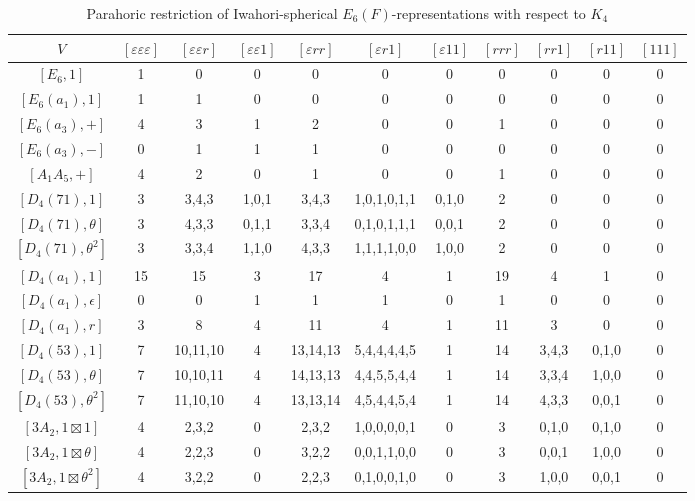 \begin{table}[ht]
    \centering
    \caption{Parahoric restriction of Iwahori-spherical $E_6(F)$-representations with respect to $K_4$}
    \label{tab:e6_a2a2a2_restriction_Dan}
    \begin{adjustbox}{max width=\linewidth}
    \begin{tabular}{|c|cccccccccc|}
    \hline
    $V$ & $[\varepsilon\varepsilon\varepsilon]$ & $[\varepsilon\varepsilon r]$ & $[\varepsilon\varepsilon 1]$ & $[\varepsilon r r]$ & $[\varepsilon r 1]$ & $[\varepsilon 1 1]$ & $[r r r]$ & $[r r 1]$ & $[r 1 1]$ & $[1 1 1]$ \\ \hline
    $[E_6, 1]$             & 1 & 0 & 0 & 0 & 0 & 0 & 0 & 0 & 0 & 0 \\ \hline
    $[E_6(a_1), 1]$        & 1 & 1 & 0 & 0 & 0 & 0 & 0 & 0 & 0 & 0\\ \hline
    $[E_6(a_3), +]$        & 4 & 3 & 1 & 2 & 0 & 0 & 1 & 0 & 0 & 0\\ 
    $[E_6(a_3), -]$        & 0 & 1 & 1 & 1 & 0 & 0 & 0 & 0 & 0 & 0\\ 
    $[A_1A_5, +]$          & 4 & 2 & 0 & 1 & 0 & 0 & 1 & 0 & 0 & 0\\ \hline

    $[D_4(71), 1]$         & 3 & 3,4,3 & 1,0,1 & 3,4,3 & 1,0,1,0,1,1 & 0,1,0 & 2 & 0 & 0 & 0 \\ 
    $[D_4(71), \theta]$    & 3 & 4,3,3 & 0,1,1 & 3,3,4 & 0,1,0,1,1,1 & 0,0,1 & 2 & 0 & 0 & 0 \\
    $[D_4(71), \theta^2]$  & 3 & 3,3,4 & 1,1,0 & 4,3,3 & 1,1,1,1,0,0 & 1,0,0 & 2 & 0 & 0 & 0 \\ \hline

    $[D_4(a_1), 1]$        & 15 & 15 & 3 & 17 & 4 & 1 & 19 & 4 & 1 & 0 \\ 
    $[D_4(a_1), \epsilon]$  & 0 & 0 & 1 & 1 & 1 & 0 & 1 & 0 & 0 & 0\\ 
    $[D_4(a_1), r]$        & 3 & 8 & 4 & 11 & 4 & 1 & 11 & 3 & 0 & 0\\\hline

    $[D_4(53), 1]$         & 7 & 10,11,10 & 4 & 13,14,13 & 5,4,4,4,4,5 & 1 & 14 & 3,4,3 & 0,1,0 & 0 \\
    $[D_4(53), \theta]$    & 7 & 10,10,11 & 4 & 14,13,13 & 4,4,5,5,4,4 & 1 & 14 & 3,3,4 & 1,0,0 & 0 \\ 
    $[D_4(53), \theta^2]$  & 7 & 11,10,10 & 4 & 13,13,14 & 4,5,4,4,5,4 & 1 & 14 & 4,3,3 & 0,0,1 & 0 \\ \hline


    $[3A_2, 1\boxtimes1]$            & 4 & 2,3,2 & 0 & 2,3,2 & 1,0,0,0,0,1 & 0 & 3 & 0,1,0 & 0,1,0 & 0 \\ 
    $[3A_2, 1\boxtimes\theta]$       & 4 & 2,2,3 & 0 & 3,2,2 & 0,0,1,1,0,0 & 0 & 3 & 0,0,1 & 1,0,0 & 0 \\ 
    $[3A_2, 1\boxtimes\theta^2]$     & 4 & 3,2,2 & 0 & 2,2,3 & 0,1,0,0,1,0 & 0 & 3 & 1,0,0 & 0,0,1 & 0 \\ \hline


\end{tabular}
\end{adjustbox}
\end{table}
